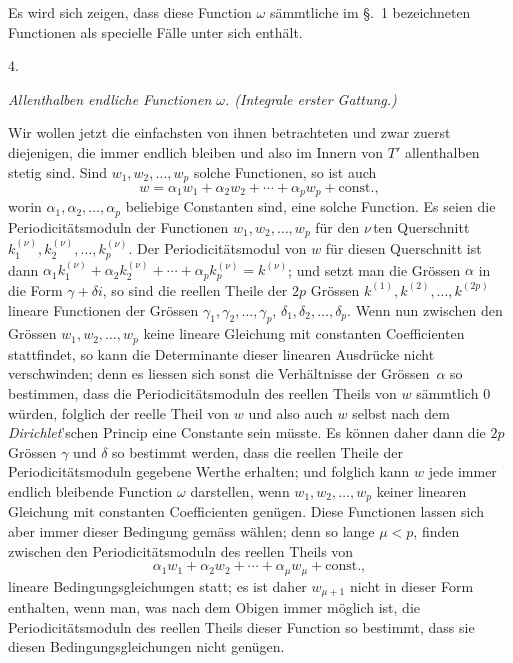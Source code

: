 \documentclass[a4paper,12pt,leqno]{article}
\begin{document}
Es wird sich zeigen, dass diese Function $\omega$ s\"{a}mmtliche
im \S.~1 bezeichneten Functionen als specielle F\"{a}lle unter
sich enth\"{a}lt.

\medbreak

\centerline{4.}

\nobreak\medskip

{\itshape
Allenthalben endliche Functionen $\omega$.  (Integrale erster
Gattung.)}

\nobreak\medskip

Wir wollen jetzt die einfachsten von ihnen betrachteten und zwar
zuerst diejenigen, die immer endlich bleiben und also im Innern
von $T'$ allenthalben stetig sind.  Sind $w_1, w_2,\ldots, w_p$
solche Functionen, so ist auch
\[ w = \alpha_1 w_1 + \alpha_2 w_2 + \cdots
         + \alpha_p w_p + \mbox{const.},\]
worin $\alpha_1, \alpha_2,\ldots, \alpha_p$ beliebige Constanten
sind, eine solche Function.  Es seien die Periodicit\"{a}tsmoduln
der Functionen $w_1, w_2,\ldots, w_p$ f\"{u}r den
$\nu \,$\-ten Querschnitt
$k_1^{(\nu)}, k_2^{(\nu)},\ldots, k_p^{(\nu)}$.  Der
Periodicit\"{a}tsmodul von $w$ f\"{u}r diesen Querschnitt ist
dann
$\alpha_1 k_1^{(\nu)} + \alpha_2 k_2^{(\nu)} + \cdots
      + \alpha_p k_p^{(\nu)} = k^{(\nu)}$;
und setzt man die Gr\"{o}ssen $\alpha$ in die Form
$\gamma + \delta i$, so sind die reellen Theile der $2p$
Gr\"{o}ssen $k^{(1)}, k^{(2)},\ldots, k^{(2p)}$ lineare
Functionen der Gr\"{o}ssen
$\gamma_1, \gamma_2,\ldots, \gamma_p$,
$\delta_1, \delta_2,\ldots, \delta_p$.
Wenn nun zwischen den Gr\"{o}ssen
$w_1, w_2,\ldots, w_p$
keine lineare Gleichung mit constanten Coefficienten stattfindet,
so kann die Determinante dieser linearen Ausdr\"{u}cke nicht
verschwinden; denn es liessen sich sonst die Verh\"{a}ltnisse der
Gr\"{o}ssen~$\alpha$ so bestimmen, dass die
Periodicit\"{a}tsmoduln des reellen Theils von $w$ s\"{a}mmtlich
$0$ w\"{u}rden, folglich der reelle Theil von $w$ und also auch
$w$ selbst nach dem \emph{Dirichlet}'schen Princip eine
Constante sein m\"{u}sste.  Es k\"{o}nnen daher dann die $2p$
Gr\"{o}ssen $\gamma$ und $\delta$ so bestimmt werden, dass die
reellen Theile der Periodicit\"{a}tsmoduln gegebene Werthe
erhalten; und folglich kann $w$ jede immer endlich bleibende
Function $\omega$ darstellen, wenn $w_1, w_2,\ldots, w_p$ keiner
linearen Gleichung mit constanten Coefficienten gen\"{u}gen.
Diese Functionen lassen sich aber immer dieser Bedingung
gem\"{a}ss w\"{a}hlen; denn so lange $\mu < p$, finden zwischen
den Periodicit\"{a}tsmoduln des reellen Theils von
\[ \alpha_1 w_1 + \alpha_2 w_2 + \cdots
      + \alpha_\mu w_\mu + \mbox{const.},\]
lineare Bedingungsgleichungen statt; es ist daher $w_{\mu + 1}$
nicht in dieser Form enthalten, wenn man, was nach dem Obigen
immer m\"{o}glich ist, die Periodicit\"{a}tsmoduln des reellen
Theils dieser Function so bestimmt, dass sie diesen
Bedingungsgleichungen nicht gen\"{u}gen.
\end{document}
